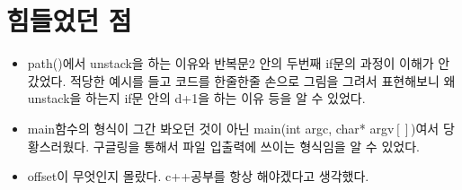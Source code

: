 \documentclass[a4paper,11pt]{article}
\begin{document}
\section{힘들었던 점}
\begin{itemize}
\item path()에서 unstack을 하는 이유와 반복문2 안의 두번째 if문의 과정이 이해가 안갔었다. 적당한 예시를 들고  코드를 한줄한줄 손으로 그림을 그려서 표현해보니 왜 unstack을 하는지 if문 안의 d+1을 하는 이유 등을 알 수 있었다.
\item main함수의 형식이 그간 봐오던 것이 아닌 main(int argc, char* argv$[]$)여서 당황스러웠다. 구글링을 통해서 파일 입출력에 쓰이는 형식임을 알 수 있었다.
\item offset이 무엇인지 몰랐다. c++공부를 항상 해야겠다고 생각했다.
\end{itemize} 
\end{document}
